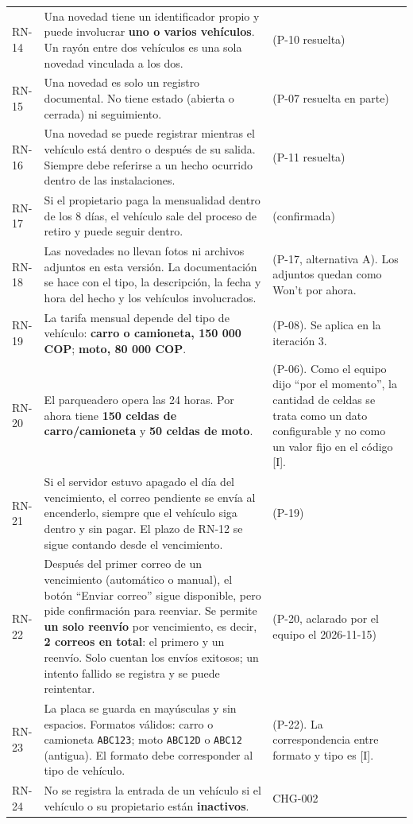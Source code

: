 \begin{longtable}{>{\raggedright\arraybackslash}p{1.5cm}>{\raggedright\arraybackslash}p{9.6cm}>{\raggedright\arraybackslash}p{3.3cm}}
RN-14 & Una novedad tiene un identificador propio y puede involucrar \textbf{uno o varios vehículos}. Un rayón entre dos vehículos es una sola novedad vinculada a los dos. & [U] (P-10 resuelta)\\
RN-15 & Una novedad es solo un registro documental. No tiene estado (abierta o cerrada) ni seguimiento. & [U] (P-07 resuelta en parte)\\
RN-16 & Una novedad se puede registrar mientras el vehículo está dentro o después de su salida. Siempre debe referirse a un hecho ocurrido dentro de las instalaciones. & [U] (P-11 resuelta)\\
RN-17 & Si el propietario paga la mensualidad dentro de los 8 días, el vehículo sale del proceso de retiro y puede seguir dentro. & [U] (confirmada)\\
RN-18 & Las novedades no llevan fotos ni archivos adjuntos en esta versión. La documentación se hace con el tipo, la descripción, la fecha y hora del hecho y los vehículos involucrados. & [U] (P-17, alternativa A). Los adjuntos quedan como Won't por ahora.\\
RN-19 & La tarifa mensual depende del tipo de vehículo: \textbf{carro o camioneta, 150 000 COP}; \textbf{moto, 80 000 COP}. & [U] (P-08). Se aplica en la iteración 3.\\
RN-20 & El parqueadero opera las 24 horas. Por ahora tiene \textbf{150 celdas de carro/camioneta} y \textbf{50 celdas de moto}. & [U] (P-06). Como el equipo dijo ``por el momento'', la cantidad de celdas se trata como un dato configurable y no como un valor fijo en el código [I].\\
RN-21 & Si el servidor estuvo apagado el día del vencimiento, el correo pendiente se envía al encenderlo, siempre que el vehículo siga dentro y sin pagar. El plazo de RN-12 se sigue contando desde el vencimiento. & [U] (P-19)\\
RN-22 & Después del primer correo de un vencimiento (automático o manual), el botón ``Enviar correo'' sigue disponible, pero pide confirmación para reenviar. Se permite \textbf{un solo reenvío} por vencimiento, es decir, \textbf{2 correos en total}: el primero y un reenvío. Solo cuentan los envíos exitosos; un intento fallido se registra y se puede reintentar. & [U] (P-20, aclarado por el equipo el 2026-11-15)\\
RN-23 & La placa se guarda en mayúsculas y sin espacios. Formatos válidos: carro o camioneta \texttt{ABC123}; moto \texttt{ABC12D} o \texttt{ABC12} (antigua). El formato debe corresponder al tipo de vehículo. & [U] (P-22). La correspondencia entre formato y tipo es [I].\\
RN-24 & No se registra la entrada de un vehículo si el vehículo o su propietario están \textbf{inactivos}. & [U] CHG-002\\
\bottomrule
\end{longtable}

